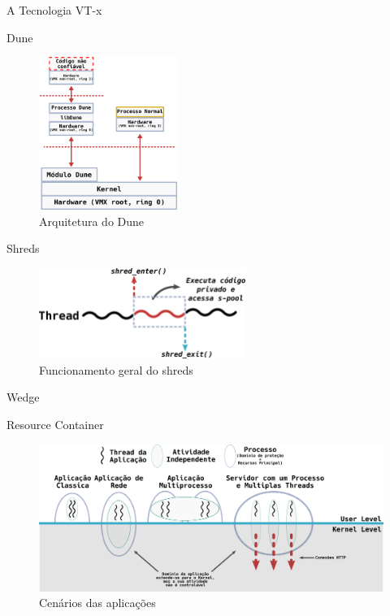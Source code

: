 \documentclass[xcolor={usenames,svgnames,dvipsnames},brazil,english,12pt,aspectratio=149]{beamer}
\begin{document}
\begin{frame}{A Tecnologia VT-x}
\end{frame}

\begin{frame}{Dune}
	\begin{figure}[!h]
		\centering
		\includegraphics[width=0.4\textwidth]{dune_architecture} 
		\caption[Arquitetura do Dune]{Arquitetura do Dune}
		\label{fig:dune_architecture}
	\end{figure}
\end{frame}

\begin{frame}{Shreds}
	\begin{figure}[!h]
		\centering
		\includegraphics[width=0.6\textwidth]{shreds} 
		\caption{Funcionamento geral do shreds}
		\label{fig:shreds}
	\end{figure}
\end{frame}

\begin{frame}{Wedge}
\end{frame}

\begin{frame}{Resource Container}
	\begin{figure}[!h]
		\centering
		\includegraphics[width=\textwidth]{resource_constainer_scenarios} 
		\caption{Cenários das aplicações}
		\label{fig:resource_constainer_scenarios}
	\end{figure}
\end{frame}
\end{document}
